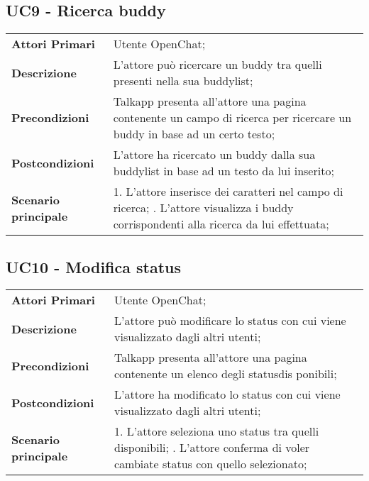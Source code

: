 \subsection{UC9 - Ricerca buddy}
	\begin{center}
	\bgroup
	\def\arraystretch{1.8}     
	\begin{longtable}{  p{4cm} | p{9.5cm} } 
		\textbf{Attori Primari} & Utente OpenChat; \\ 
		\textbf{Descrizione} &  L'attore può ricercare un  buddy tra quelli presenti nella sua buddylist; \\ 
		\textbf{Precondizioni}  & Talkapp presenta all'attore una pagina contenente un campo di ricerca per ricercare un buddy in base ad un certo testo; \\
		\textbf{Postcondizioni} & L'attore ha ricercato un buddy dalla sua buddylist in base ad un testo da lui inserito;  \\ 
		\textbf{Scenario principale} & 
		1. L'attore inserisce dei caratteri nel campo di ricerca; \newline
		2. L'attore visualizza i buddy corrispondenti alla ricerca da lui effettuata;
	\end{longtable}
	\egroup
\end{center}

\subsection{UC10 - Modifica status}
	\begin{center}
	\bgroup
	\def\arraystretch{1.8}     
	\begin{longtable}{  p{4cm} | p{9.5cm} } 
		\textbf{Attori Primari} & Utente OpenChat; \\ 
		\textbf{Descrizione} &  L'attore può modificare lo status con cui viene visualizzato dagli altri utenti; \\ 
		\textbf{Precondizioni}  & Talkapp presenta all'attore una pagina contenente un elenco degli statusdis ponibili; \\
		\textbf{Postcondizioni} & L'attore ha modificato lo status con cui viene visualizzato dagli altri utenti; \\ 
		\textbf{Scenario principale} & 
		1. L'attore seleziona uno status tra quelli disponibili; \newline
		2. L'attore conferma di voler cambiate status con quello selezionato;
	\end{longtable}
	\egroup
\end{center}

